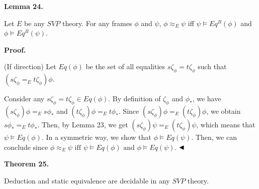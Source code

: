  
 
\par\medskip\noindent\textbf{Lemma 24.}\par
 
 
Let $E$ be any $\mathit{SVP}$ theory. For any frames $\phi$ and $\psi$, $\phi\approx_{E}\psi$ iff $\psi\models Eq^{B}(\phi)$ and $\phi\models Eq^{B}(\psi)$.\par
 
 
 
 
 
\par\medskip\noindent\textbf{Proof.}\par
 
 
(If direction) Let $Eq(\phi)$ be the set of all equalities $s\zeta_{\phi}=t\zeta_{\phi}$ such that $(s\zeta_{\phi}=_{E}t\zeta_{\phi})\phi$.\par
 
 
 
Consider any $s\zeta_{\phi}=t\zeta_{\phi}\in Eq(\phi)$. By definition of $\zeta_{\phi}$ and $\phi_{*}$, we have $(s\zeta_{\phi})\phi=_{E}s\phi_{*}$ and $(t\zeta_{\phi})\phi=_{E}t\phi_{*}$. Since $(s\zeta_{\phi})\phi=_{E}(t\zeta_{\phi})\phi$, we obtain $s\phi_{*}=_{E}t\phi_{*}$. Then, by Lemma 23, we get $(s\zeta_{\phi})\psi=_{E}(t\zeta_{\phi})\psi$, which means that $\psi\models Eq(\phi)$. In a symmetric way, we show that $\phi\models Eq(\psi)$. Then, we can conclude since $\phi\approx_{E}\psi\mbox{ iff }\psi\models Eq(\phi)\mbox{ and }\phi\models Eq(\psi)$. $\hfill\blacktriangleleft$\par
 
 
 
\par\medskip\noindent\textbf{Theorem 25.}\par
 
 
Deduction and static equivalence are decidable in any $\mathit{SVP}$ theory.\par
 
